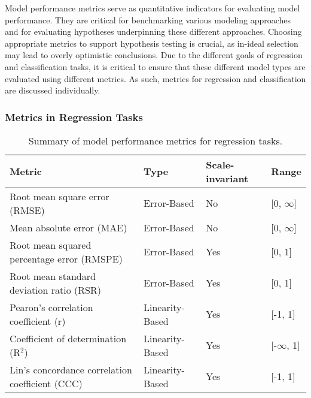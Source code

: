 Model performance metrics serve as quantitative indicators for evaluating model performance. They are critical for benchmarking various modeling approaches and for evaluating hypotheses underpinning these different approaches. Choosing appropriate metrics to support hypothesis testing is crucial, as in-ideal selection may lead to overly optimistic conclusions. Due to the different goals of regression and classification tasks, it is critical to ensure that these different model types are evaluated using different metrics. As such, metrics for regression and classification are discussed individually.

\subsubsection{Metrics in Regression Tasks}

\begin{table}
    \caption{Summary of model performance metrics for regression tasks.}
    \centering
    \begin{tabular}{llll}
        \toprule
        Metric & Type & Scale-invariant & Range \\
        \midrule
        Root mean square error (RMSE) & Error-Based & No & [0, $\infty$] \\
        Mean absolute error (MAE) & Error-Based & No & [0, $\infty$] \\
        Root mean squared percentage error (RMSPE) & Error-Based & Yes & [0, 1] \\
        Root mean standard deviation ratio (RSR) & Error-Based & Yes & [0, 1] \\
        Pearon's correlation coefficient (r) & Linearity-Based  & Yes & [-1, 1] \\
        Coefficient of determination (R$^2$) & Linearity-Based & Yes & [-$\infty$, 1] \\
        Lin's concordance correlation coefficient (CCC) & Linearity-Based & Yes & [-1, 1] \\
        \bottomrule
    \end{tabular}
    \label{tab:metrics-reg}
\end{table}

